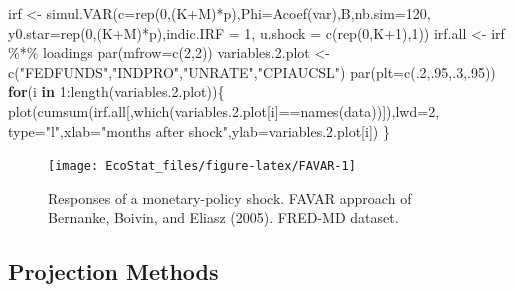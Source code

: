 \documentclass[
  12pt,
]{book}
\newenvironment{Shaded}{\begin{snugshade}}{\end{snugshade}}
\newcommand{\AttributeTok}[1]{\textcolor[rgb]{0.77,0.63,0.00}{#1}}
\newcommand{\ControlFlowTok}[1]{\textcolor[rgb]{0.13,0.29,0.53}{\textbf{#1}}}
\newcommand{\DecValTok}[1]{\textcolor[rgb]{0.00,0.00,0.81}{#1}}
\newcommand{\FloatTok}[1]{\textcolor[rgb]{0.00,0.00,0.81}{#1}}
\newcommand{\FunctionTok}[1]{\textcolor[rgb]{0.00,0.00,0.00}{#1}}
\newcommand{\NormalTok}[1]{#1}
\newcommand{\OtherTok}[1]{\textcolor[rgb]{0.56,0.35,0.01}{#1}}
\newcommand{\SpecialCharTok}[1]{\textcolor[rgb]{0.00,0.00,0.00}{#1}}
\newcommand{\StringTok}[1]{\textcolor[rgb]{0.31,0.60,0.02}{#1}}
\theoremstyle{definition}
\theoremstyle{definition}
\theoremstyle{definition}
\theoremstyle{definition}
\theoremstyle{remark}
\begin{document}
\begin{Shaded}
\begin{Highlighting}[]
\NormalTok{irf }\OtherTok{\textless{}{-}} \FunctionTok{simul.VAR}\NormalTok{(}\AttributeTok{c=}\FunctionTok{rep}\NormalTok{(}\DecValTok{0}\NormalTok{,(K}\SpecialCharTok{+}\NormalTok{M)}\SpecialCharTok{*}\NormalTok{p),}\AttributeTok{Phi=}\FunctionTok{Acoef}\NormalTok{(var),B,}\AttributeTok{nb.sim=}\DecValTok{120}\NormalTok{,}
                 \AttributeTok{y0.star=}\FunctionTok{rep}\NormalTok{(}\DecValTok{0}\NormalTok{,(K}\SpecialCharTok{+}\NormalTok{M)}\SpecialCharTok{*}\NormalTok{p),}\AttributeTok{indic.IRF =} \DecValTok{1}\NormalTok{,}
                 \AttributeTok{u.shock =} \FunctionTok{c}\NormalTok{(}\FunctionTok{rep}\NormalTok{(}\DecValTok{0}\NormalTok{,K}\SpecialCharTok{+}\DecValTok{1}\NormalTok{),}\DecValTok{1}\NormalTok{))}
\NormalTok{irf.all }\OtherTok{\textless{}{-}}\NormalTok{ irf }\SpecialCharTok{\%*\%}\NormalTok{ loadings}
\FunctionTok{par}\NormalTok{(}\AttributeTok{mfrow=}\FunctionTok{c}\NormalTok{(}\DecValTok{2}\NormalTok{,}\DecValTok{2}\NormalTok{))}
\NormalTok{variables.}\FloatTok{2.}\NormalTok{plot }\OtherTok{\textless{}{-}} \FunctionTok{c}\NormalTok{(}\StringTok{"FEDFUNDS"}\NormalTok{,}\StringTok{"INDPRO"}\NormalTok{,}\StringTok{"UNRATE"}\NormalTok{,}\StringTok{"CPIAUCSL"}\NormalTok{)}
\FunctionTok{par}\NormalTok{(}\AttributeTok{plt=}\FunctionTok{c}\NormalTok{(.}\DecValTok{2}\NormalTok{,.}\DecValTok{95}\NormalTok{,.}\DecValTok{3}\NormalTok{,.}\DecValTok{95}\NormalTok{))}
\ControlFlowTok{for}\NormalTok{(i }\ControlFlowTok{in} \DecValTok{1}\SpecialCharTok{:}\FunctionTok{length}\NormalTok{(variables.}\FloatTok{2.}\NormalTok{plot))\{}
  \FunctionTok{plot}\NormalTok{(}\FunctionTok{cumsum}\NormalTok{(irf.all[,}\FunctionTok{which}\NormalTok{(variables.}\FloatTok{2.}\NormalTok{plot[i]}\SpecialCharTok{==}\FunctionTok{names}\NormalTok{(data))]),}\AttributeTok{lwd=}\DecValTok{2}\NormalTok{,}
       \AttributeTok{type=}\StringTok{"l"}\NormalTok{,}\AttributeTok{xlab=}\StringTok{"months after shock"}\NormalTok{,}\AttributeTok{ylab=}\NormalTok{variables.}\FloatTok{2.}\NormalTok{plot[i])}
\NormalTok{\}}
\end{Highlighting}
\end{Shaded}

\begin{figure}
\texttt{[image: EcoStat\_files/figure-latex/FAVAR-1]} \caption{Responses of a monetary-policy shock. FAVAR approach of Bernanke, Boivin, and Eliasz (2005). FRED-MD dataset.}\label{fig:FAVAR}
\end{figure}

\hypertarget{Projections}{%
\subsection{Projection Methods}\label{Projections}}
\end{document}
